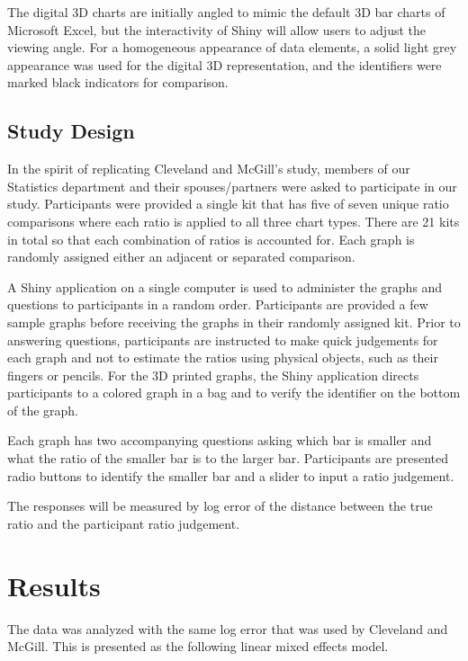 \documentclass[letterpaper,inpress]{jdsart}
\begin{document}
The digital 3D charts are initially angled to mimic the default 3D bar charts of Microsoft Excel, but the interactivity of Shiny will allow users to adjust the viewing angle.
For a homogeneous appearance of data elements, a solid light grey appearance was used for the digital 3D representation, and the identifiers were marked black indicators for comparison.

\hypertarget{study-design}{%
\subsection{Study Design}\label{study-design}}

In the spirit of replicating Cleveland and McGill's study, members of our Statistics department and their spouses/partners were asked to participate in our study.
Participants were provided a single kit that has five of seven unique ratio comparisons where each ratio is applied to all three chart types.
There are 21 kits in total so that each combination of ratios is accounted for.
Each graph is randomly assigned either an adjacent or separated comparison.

A Shiny application on a single computer is used to administer the graphs and questions to participants in a random order.
Participants are provided a few sample graphs before receiving the graphs in their randomly assigned kit.
Prior to answering questions, participants are instructed to make quick judgements for each graph and not to estimate the ratios using physical objects, such as their fingers or pencils.
For the 3D printed graphs, the Shiny application directs participants to a colored graph in a bag and to verify the identifier on the bottom of the graph.

Each graph has two accompanying questions asking which bar is smaller and what the ratio of the smaller bar is to the larger bar.
Participants are presented radio buttons to identify the smaller bar and a slider to input a ratio judgement.

The responses will be measured by log error of the distance between the true ratio and the participant ratio judgement.

\hypertarget{results}{%
\section{Results}\label{results}}

The data was analyzed with the same log error that was used by Cleveland and McGill. This is presented as the following linear mixed effects model.
\end{document}
